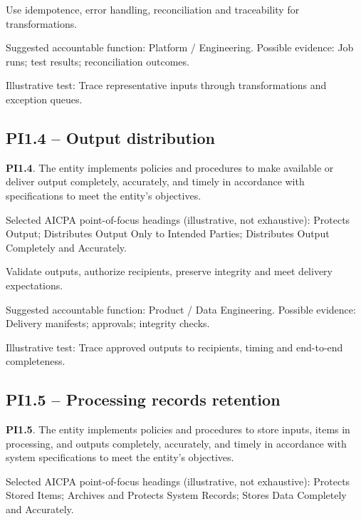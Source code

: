 \documentclass[10pt,oneside]{report}
\begin{document}
\begin{engineeringbox}
Use idempotence, error handling, reconciliation and traceability for transformations.
\end{engineeringbox}
Suggested accountable function: Platform / Engineering. Possible evidence: Job runs; test results; reconciliation outcomes.

Illustrative test: Trace representative inputs through transformations and exception queues.

\subsection*{PI1.4 -- Output distribution}
\begin{aicpabox}
\textbf{PI1.4}. The entity implements policies and procedures to make available or deliver output completely, accurately, and timely in accordance with specifications to meet the entity's objectives.\par{}
\end{aicpabox}
Selected AICPA point-of-focus headings (illustrative, not exhaustive): Protects Output; Distributes Output Only to Intended Parties; Distributes Output Completely and Accurately.

\begin{engineeringbox}
Validate outputs, authorize recipients, preserve integrity and meet delivery expectations.
\end{engineeringbox}
Suggested accountable function: Product / Data Engineering. Possible evidence: Delivery manifests; approvals; integrity checks.

Illustrative test: Trace approved outputs to recipients, timing and end-to-end completeness.

\subsection*{PI1.5 -- Processing records retention}
\begin{aicpabox}
\textbf{PI1.5}. The entity implements policies and procedures to store inputs, items in processing, and outputs completely, accurately, and timely in accordance with system specifications to meet the entity's objectives.\par{}
\end{aicpabox}
Selected AICPA point-of-focus headings (illustrative, not exhaustive): Protects Stored Items; Archives and Protects System Records; Stores Data Completely and Accurately.
\end{document}
